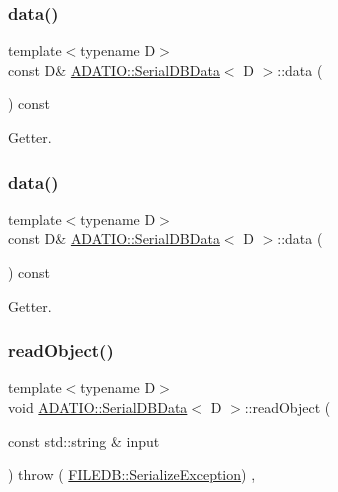 \subsubsection{\texorpdfstring{data()}{data()}\hspace{0.1cm}{\footnotesize\ttfamily [3/4]}}
{\footnotesize\ttfamily template$<$typename D$>$ \\
const D\& \mbox{\hyperlink{classADATIO_1_1SerialDBData}{A\+D\+A\+T\+I\+O\+::\+Serial\+D\+B\+Data}}$<$ D $>$\+::data (\begin{DoxyParamCaption}{ }\end{DoxyParamCaption}) const\hspace{0.3cm}{\ttfamily [inline]}}



Getter. 

\mbox{\label{classADATIO_1_1SerialDBData_a5532be95ec6214348c087afd8b2ff683}} 
\subsubsection{\texorpdfstring{data()}{data()}\hspace{0.1cm}{\footnotesize\ttfamily [4/4]}}
{\footnotesize\ttfamily template$<$typename D$>$ \\
const D\& \mbox{\hyperlink{classADATIO_1_1SerialDBData}{A\+D\+A\+T\+I\+O\+::\+Serial\+D\+B\+Data}}$<$ D $>$\+::data (\begin{DoxyParamCaption}{ }\end{DoxyParamCaption}) const\hspace{0.3cm}{\ttfamily [inline]}}



Getter. 

\mbox{\label{classADATIO_1_1SerialDBData_a2f7405b96f413b1787fc2072b8932c20}} 
\subsubsection{\texorpdfstring{readObject()}{readObject()}\hspace{0.1cm}{\footnotesize\ttfamily [1/2]}}
{\footnotesize\ttfamily template$<$typename D$>$ \\
void \mbox{\hyperlink{classADATIO_1_1SerialDBData}{A\+D\+A\+T\+I\+O\+::\+Serial\+D\+B\+Data}}$<$ D $>$\+::read\+Object (\begin{DoxyParamCaption}\item[{const std\+::string \&}]{input }\end{DoxyParamCaption}) throw ( \mbox{\hyperlink{classFILEDB_1_1SerializeException}{F\+I\+L\+E\+D\+B\+::\+Serialize\+Exception}}) \hspace{0.3cm}{\ttfamily [inline]}, {\ttfamily [virtual]}}

